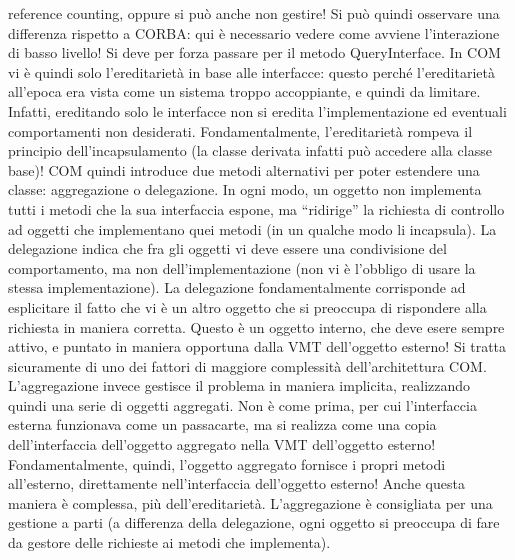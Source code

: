reference counting, oppure si può anche non gestire! Si può quindi osservare una differenza rispetto a CORBA: qui è
necessario vedere come avviene l'interazione di basso livello! Si deve per forza passare per il metodo QueryInterface.
In COM vi è quindi solo l'ereditarietà in base alle interfacce: questo perché l'ereditarietà all'epoca era vista come un
sistema troppo accoppiante, e quindi da limitare. Infatti, ereditando solo le interfacce non si eredita
l'implementazione ed eventuali comportamenti non desiderati. Fondamentalmente, l'ereditarietà rompeva il principio
dell'incapsulamento (la classe derivata infatti può accedere alla classe base)!
COM quindi introduce due metodi alternativi per poter estendere una classe: aggregazione o delegazione. In ogni modo, un
oggetto non implementa tutti i metodi che la sua interfaccia espone, ma ``ridirige'' la richiesta di controllo ad
oggetti che implementano quei metodi (in un qualche modo li incapsula).
La delegazione indica che fra gli oggetti vi deve essere una condivisione del comportamento, ma non dell'implementazione
(non vi è l'obbligo di usare la stessa implementazione). La delegazione fondamentalmente corrisponde ad esplicitare il
fatto che vi è un altro oggetto che si preoccupa di rispondere alla richiesta in maniera corretta. Questo è un oggetto
interno, che deve esere sempre attivo, e puntato in maniera opportuna dalla VMT dell'oggetto esterno!
Si tratta sicuramente di uno dei fattori di maggiore complessità dell'architettura COM.
L'aggregazione invece gestisce il problema in maniera implicita, realizzando quindi una serie di oggetti aggregati. Non
è come prima, per cui l'interfaccia esterna funzionava come un passacarte, ma si realizza come una copia
dell'interfaccia dell'oggetto aggregato nella VMT dell'oggetto esterno! Fondamentalmente, quindi, l'oggetto aggregato
fornisce i propri metodi all'esterno, direttamente nell'interfaccia dell'oggetto esterno! Anche questa maniera è
complessa, più dell'ereditarietà. L'aggregazione è consigliata per una gestione a parti (a differenza della delegazione,
ogni oggetto si preoccupa di fare da gestore delle richieste ai metodi che implementa).

